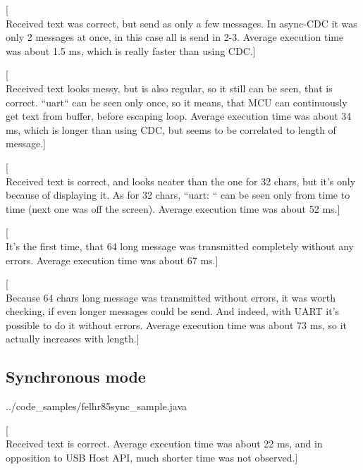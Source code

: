 [\\Received text was correct, but send as only a few messages. 
In async-CDC it was only 2 messages at once, in this case all is send in 2-3.
Average execution time was about 1.5 ms, which is really faster than using CDC.]

[\\Received text looks messy, but is also regular, so it still can be seen,
that is correct. ``uart`` can be seen only once, so it means, that MCU can
continuously get text from buffer, before escaping loop.
Average execution time was about 34 ms, which is longer than using CDC, but
seems to be correlated to length of message.]

[\\Received text is correct, and looks neater than the one for 32 chars, but
it's only because of displaying it. 
As for 32 chars, ``uart: `` can be seen only from time to time (next one was
off the screen).
Average execution time was about 52 ms.]

[\\It's the first time, that 64 long message was transmitted completely without
any errors.
Average execution time was about 67 ms.]

[\\Because 64 chars long message was transmitted without errors, it was worth
checking, if even longer messages could be send. 
And indeed, with UART it's possible to do it without errors.
Average execution time was about 73 ms, so it actually increases with length.]

\clearpage

\subsection{Synchronous mode}


{../code_samples/felhr85sync_sample.java}

[\\Received text is correct.
Average execution time was about 22 ms, and in opposition to USB Host API, much
shorter time was not observed.]

